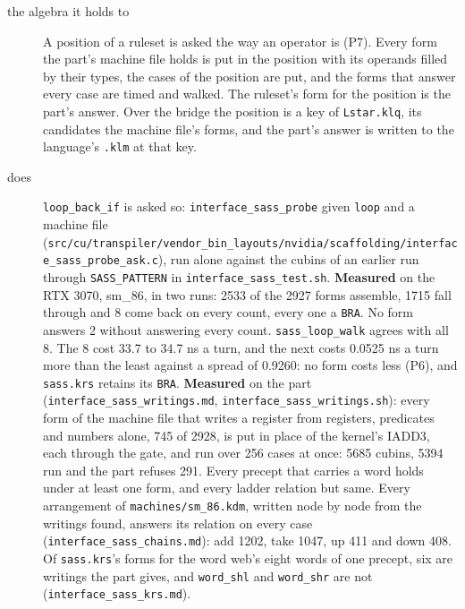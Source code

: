 \begin{description}
\item[{the algebra it holds to}] A position of a ruleset is asked the way an operator is (P7). Every form the part's machine file holds is put in the position with its operands filled by their types, the cases of the position are put, and the forms that answer every case are timed and walked. The ruleset's form for the position is the part's answer. Over the bridge the position is a key of \texttt{Lstar.\allowbreak{}klq}, its candidates the machine file's forms, and the part's answer is written to the language's \texttt{.\allowbreak{}klm} at that key.
\item[{does}] \texttt{loop\_\allowbreak{}back\_\allowbreak{}if} is asked so: \texttt{interface\_\allowbreak{}sass\_\allowbreak{}probe} given \texttt{loop} and a machine file (\texttt{src/\allowbreak{}cu/\allowbreak{}transpiler/\allowbreak{}vendor\_\allowbreak{}bin\_\allowbreak{}layouts/\allowbreak{}nvidia/\allowbreak{}scaffolding/\allowbreak{}interface\_\allowbreak{}sass\_\allowbreak{}probe\_\allowbreak{}ask.\allowbreak{}c}), run alone against the cubins of an earlier run through \texttt{SASS\_\allowbreak{}PATTERN} in \texttt{interface\_\allowbreak{}sass\_\allowbreak{}test.\allowbreak{}sh}. \textbf{Measured} on the RTX 3070, sm\_\allowbreak{}86, in two runs: 2533 of the 2927 forms assemble, 1715 fall through and 8 come back on every count, every one a \texttt{BRA}. No form answers 2 without answering every count. \texttt{sass\_\allowbreak{}loop\_\allowbreak{}walk} agrees with all 8. The 8 cost 33.7 to 34.7 ns a turn, and the next costs 0.0525 ns a turn more than the least against a spread of 0.9260: no form costs less (P6), and \texttt{sass.\allowbreak{}krs} retains its \texttt{BRA}. \textbf{Measured} on the part (\texttt{interface\_\allowbreak{}sass\_\allowbreak{}writings.\allowbreak{}md}, \texttt{interface\_\allowbreak{}sass\_\allowbreak{}writings.\allowbreak{}sh}): every form of the machine file that writes a register from registers, predicates and numbers alone, 745 of 2928, is put in place of the kernel's IADD3, each through the gate, and run over 256 cases at once: 5685 cubins, 5394 run and the part refuses 291. Every precept that carries a word holds under at least one form, and every ladder relation but same. Every arrangement of \texttt{machines/\allowbreak{}sm\_\allowbreak{}86.\allowbreak{}kdm}, written node by node from the writings found, answers its relation on every case (\texttt{interface\_\allowbreak{}sass\_\allowbreak{}chains.\allowbreak{}md}): add 1202, take 1047, up 411 and down 408. Of \texttt{sass.\allowbreak{}krs}'s forms for the word web's eight words of one precept, six are writings the part gives, and \texttt{word\_\allowbreak{}shl} and \texttt{word\_\allowbreak{}shr} are not (\texttt{interface\_\allowbreak{}sass\_\allowbreak{}krs.\allowbreak{}md}).

\end{description}

